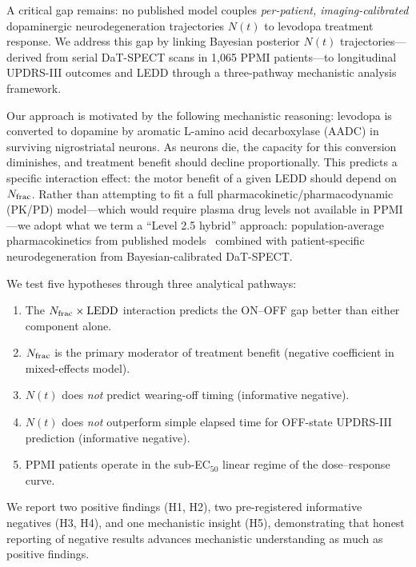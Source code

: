 A critical gap remains: no published model couples \textit{per-patient,
imaging-calibrated} dopaminergic neurodegeneration trajectories $N(t)$ to
levodopa treatment response. We address this gap by linking Bayesian
posterior $N(t)$ trajectories---derived from serial DaT-SPECT scans in
1,065 PPMI patients---to longitudinal UPDRS-III outcomes and LEDD through
a three-pathway mechanistic analysis framework.

Our approach is motivated by the following mechanistic reasoning:
levodopa is converted to dopamine by aromatic L-amino acid decarboxylase
(AADC) in surviving nigrostriatal neurons. As neurons die, the capacity
for this conversion diminishes, and treatment benefit should decline
proportionally. This predicts a specific interaction effect: the motor
benefit of a given LEDD should depend on $N_{\mathrm{frac}}$. Rather than attempting
to fit a full pharmacokinetic/pharmacodynamic (PK/PD) model---which would
require plasma drug levels not available in PPMI---we adopt what we term
a ``Level 2.5 hybrid'' approach: population-average pharmacokinetics from
published models~\cite{simon2016} combined with patient-specific
neurodegeneration from Bayesian-calibrated DaT-SPECT.

We test five hypotheses through three analytical pathways:
\begin{enumerate}[label=\textbf{H\arabic*:}, leftmargin=2.5em]
  \item The $N_{\mathrm{frac}} \times \mathrm{LEDD}$ interaction predicts the ON--OFF gap
    better than either component alone.
  \item $N_{\mathrm{frac}}$ is the primary moderator of treatment benefit
    (negative coefficient in mixed-effects model).
  \item $N(t)$ does \textit{not} predict wearing-off timing
    (informative negative).
  \item $N(t)$ does \textit{not} outperform simple elapsed time for
    OFF-state UPDRS-III prediction (informative negative).
  \item PPMI patients operate in the sub-EC$_{50}$ linear regime of the
    dose--response curve.
\end{enumerate}

We report two positive findings (H1, H2), two pre-registered informative
negatives (H3, H4), and one mechanistic insight (H5), demonstrating that
honest reporting of negative results advances mechanistic understanding
as much as positive findings.


